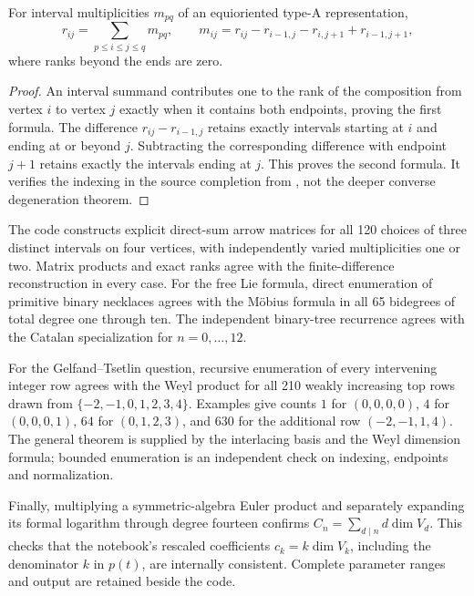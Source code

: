 \begin{proposition}\ours
For interval multiplicities \(m_{pq}\) of an equioriented type-A representation,
\[
 r_{ij}=\sum_{p\le i\le j\le q}m_{pq},\qquad
 m_{ij}=r_{ij}-r_{i-1,j}-r_{i,j+1}+r_{i-1,j+1},
\]
where ranks beyond the ends are zero.
\end{proposition}
\begin{proof}
An interval summand contributes one to the rank of the composition from vertex \(i\) to vertex \(j\) exactly when it contains both endpoints, proving the first formula. The difference \(r_{ij}-r_{i-1,j}\) retains exactly intervals starting at \(i\) and ending at or beyond \(j\). Subtracting the corresponding difference with endpoint \(j+1\) retains exactly the intervals ending at \(j\). This proves the second formula. It verifies the indexing in the source completion from \citet[\S2.3]{abeasisdelfrakraft1981geometry}, not the deeper converse degeneration theorem.
\end{proof}

\begin{remark}\oursComputed
The code constructs explicit direct-sum arrow matrices for all 120 choices of three distinct intervals on four vertices, with independently varied multiplicities one or two. Matrix products and exact ranks agree with the finite-difference reconstruction in every case. For the free Lie formula, direct enumeration of primitive binary necklaces agrees with the M\"obius formula in all 65 bidegrees of total degree one through ten. The independent binary-tree recurrence agrees with the Catalan specialization for \(n=0,\ldots,12\).

For the Gelfand--Tsetlin question, recursive enumeration of every intervening integer row agrees with the Weyl product for all 210 weakly increasing top rows drawn from \(\{-2,-1,0,1,2,3,4\}\). Examples give counts \(1\) for \((0,0,0,0)\), \(4\) for \((0,0,0,1)\), \(64\) for \((0,1,2,3)\), and \(630\) for the additional row \((-2,-1,1,4)\). The general theorem is supplied by the interlacing basis \citep[\S3]{gelfandtsetlin1950unimodular} and the Weyl dimension formula; bounded enumeration is an independent check on indexing, endpoints and normalization.

Finally, multiplying a symmetric-algebra Euler product and separately expanding its formal logarithm through degree fourteen confirms \(C_n=\sum_{d\mid n}d\dim V_d\). This checks that the notebook's rescaled coefficients \(c_k=k\dim V_k\), including the denominator \(k\) in \(p(t)\), are internally consistent. Complete parameter ranges and output are retained beside the code.
\end{remark}

